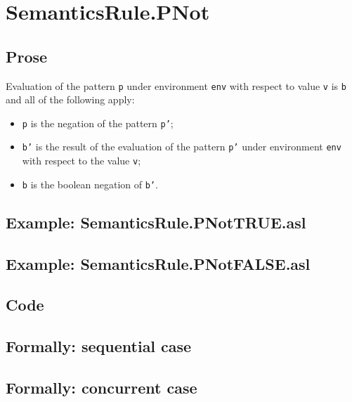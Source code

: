 \documentclass{book}
\begin{document}

\section{SemanticsRule.PNot \label{sec:SemanticsRule.PNot}}

    \subsection{Prose}
    Evaluation of the pattern \texttt{p} under environment \texttt{env} with
    respect to value \texttt{v} is \texttt{b} and all of the following apply:
    \begin{itemize}
      \item \texttt{p} is the negation of the pattern \texttt{p'};
      \item \texttt{b'} is the result of the evaluation of the pattern \texttt{p'} under environment \texttt{env} with respect to the value \texttt{v};
      \item \texttt{b} is the boolean negation of \texttt{b'}.
    \end{itemize}
 
    \subsection{Example: SemanticsRule.PNotTRUE.asl}

    \subsection{Example: SemanticsRule.PNotFALSE.asl}

  \subsection{Code}

\begin{emptyformal}
  \subsection{Formally: sequential case}

  \subsection{Formally: concurrent case}
\end{emptyformal}
\end{document}
